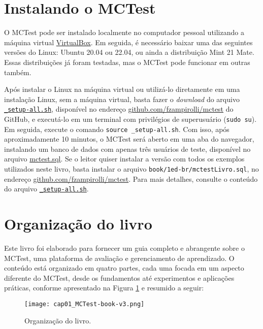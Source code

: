 \section{Instalando o MCTest}\label{sec:instalacao}

O MCTest pode ser instalado localmente no computador pessoal utilizando a máquina virtual \href{https://www.virtualbox.org/}{VirtualBox}. Em seguida, é necessário baixar uma das seguintes versões do Linux: Ubuntu 20.04 ou 22.04, ou ainda a distribuição Mint 21 Mate. Essas distribuições já foram testadas, mas o MCTest pode funcionar em outras também.

Após instalar o Linux na máquina virtual ou utilizá-lo diretamente em uma instalação Linux, sem a máquina virtual, basta fazer o \textit{download} do arquivo \href{https://raw.githubusercontent.com/fzampirolli/mctest/master/_setup-all.sh}{\texttt{\_setup-all.sh}}, disponível no endereço \href{https://github.com/fzampirolli/mctest}{github.com/fzampirolli/mctest} do GitHub, e executá-lo em um terminal com privilégios de superusuário (\verb|sudo su|). Em seguida, execute o comando \verb|source _setup-all.sh|. Com isso, após aproximadamente 10 minutos, o MCTest será aberto em uma aba do navegador, instalando um banco de dados com apenas três usuários de teste, disponível no arquivo  \href{https://github.com/fzampirolli/mctest/blob/master/mctest.sql}{mctest.sql}. Se o leitor quiser instalar a versão com todos os exemplos utilizados neste livro, basta instalar o arquivo \verb|book/1ed-br/mctestLivro.sql|, no endereço \href{https://github.com/fzampirolli/mctest/blob/master/book/1ed-br/mctestLivro.sql}{github.com/fzampirolli/mctest}. Para mais detalhes, consulte o conteúdo do arquivo \href{https://raw.githubusercontent.com/fzampirolli/mctest/master/_setup-all.sh}{\texttt{\_setup-all.sh}}.


\section{Organização do livro}

Este livro foi elaborado para fornecer um guia completo e abrangente sobre o MCTest, uma plataforma de avaliação e gerenciamento de aprendizado. O conteúdo está organizado em quatro partes, cada uma focada em um aspecto diferente do MCTest, desde os fundamentos até experimentos e aplicações práticas, conforme apresentado na Figura \ref{fig:cap01_MCTest-book} e resumido a seguir:

\begin{figure}[!ht]
  \centering
  \texttt{[image: cap01\_MCTest-book-v3.png]}\vspace{-0mm}
  \caption{Organização do livro.}
  \label{fig:cap01_MCTest-book}
\end{figure}

